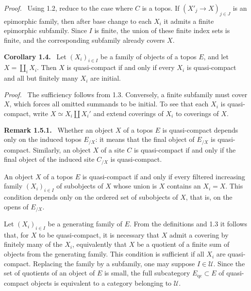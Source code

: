 \documentclass[11pt]{article}
\newcommand{\U}{\mathcal{U}}
\newcommand{\qc}{\mathrm{qc}}
\newenvironment{statement}[1]{\par\medskip\noindent\textbf{#1.}\ }{\par\medskip}
\newenvironment{remarktext}[1]{\par\medskip\noindent\textbf{#1.}\ }{\par\medskip}
\newenvironment{prooftext}{\par\noindent\emph{Proof.}\ }{\par\medskip}
\begin{document}
\begin{prooftext}
Using 1.2, reduce to the case where \(C\) is a topos. If \((X'_j\to X)_{j\in J}\) is an epimorphic family, then after base change to each \(X_i\) it admits a finite epimorphic subfamily. Since \(I\) is finite, the union of these finite index sets is finite, and the corresponding subfamily already covers \(X\).
\end{prooftext}

\begin{statement}{Corollary 1.4}
Let \((X_i)_{i\in I}\) be a family of objects of a topos \(E\), and let \(X=\coprod_iX_i\). Then \(X\) is quasi-compact if and only if every \(X_i\) is quasi-compact and all but finitely many \(X_i\) are initial.
\end{statement}

\begin{prooftext}
The sufficiency follows from 1.3. Conversely, a finite subfamily must cover \(X\), which forces all omitted summands to be initial. To see that each \(X_i\) is quasi-compact, write \(X\simeq X_i\amalg X_i'\) and extend coverings of \(X_i\) to coverings of \(X\).
\end{prooftext}

\begin{remarktext}{Remark 1.5.1}
Whether an object \(X\) of a topos \(E\) is quasi-compact depends only on the induced topos \(E_{/X}\): it means that the final object of \(E_{/X}\) is quasi-compact. Similarly, an object \(X\) of a site \(C\) is quasi-compact if and only if the final object of the induced site \(C_{/X}\) is quasi-compact.
\end{remarktext}

An object \(X\) of a topos \(E\) is quasi-compact if and only if every filtered increasing family \((X_i)_{i\in I}\) of subobjects of \(X\) whose union is \(X\) contains an \(X_i=X\). This condition depends only on the ordered set of subobjects of \(X\), that is, on the opens of \(E_{/X}\).

Let \((X_i)_{i\in I}\) be a generating family of \(E\). From the definitions and 1.3 it follows that, for \(X\) to be quasi-compact, it is necessary that \(X\) admit a covering by finitely many of the \(X_i\), equivalently that \(X\) be a quotient of a finite sum of objects from the generating family. This condition is sufficient if all \(X_i\) are quasi-compact. Replacing the family by a subfamily, one may suppose \(I\in\U\). Since the set of quotients of an object of \(E\) is small, the full subcategory \(E_{\qc}\subset E\) of quasi-compact objects is equivalent to a category belonging to \(\U\).
\end{document}
